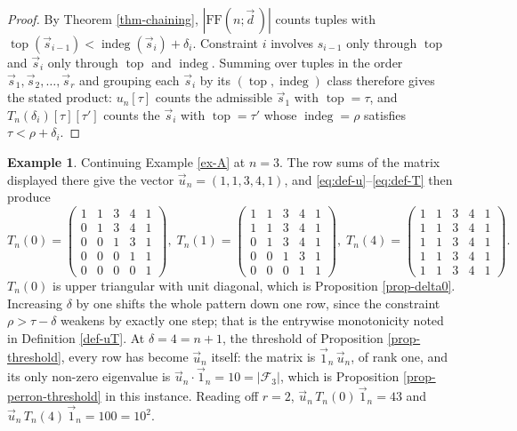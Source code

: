 \documentclass[11pt, a4paper, abstract=yes]{scrartcl}
\theoremstyle{definition}
\newtheorem{mexample}[definition]{Example}
\theoremstyle{remark}
\theoremstyle{plain}
\newcommand{\indeg}{\operatorname{indeg}}
\newcommand{\tp}{\operatorname{top}}
\begin{document}
\begin{proof}
By Theorem \ref{thm-chaining}, \(|\mathrm{FF}(n;\vec d\,)|\) counts tuples with
\(\tp(\vec s_{i-1})<\indeg(\vec s_i)+\delta_i\). Constraint \(i\) involves \(s_{i-1}\) only through \(\tp\) and
\(\vec s_i\) only through \(\tp\) and \(\indeg\). Summing over tuples in the order \(\vec s_1,\vec s_2,\dots,\vec s_r\)
and grouping each \(\vec s_i\) by its \((\tp,\indeg)\) class therefore gives the stated product: \(u_n[\tau]\)
counts the admissible \(\vec s_1\) with \(\tp=\tau\), and \(T_n(\delta_i)[\tau][\tau']\) counts the \(\vec s_i\)
with \(\tp=\tau'\) whose \(\indeg=\rho\) satisfies \(\tau<\rho+\delta_i\).
\end{proof}

\begin{mexample}
Continuing Example \ref{ex-A} at \(n=3\). The row sums of the matrix displayed there give the vector
\(\vec u_n=(1,1,3,4,1)\), and \eqref{eq:def-u}--\eqref{eq:def-T} then produce
\[
  T_n(0)=\begin{pmatrix}
    1&1&3&4&1\\ 0&1&3&4&1\\ 0&0&1&3&1\\ 0&0&0&1&1\\ 0&0&0&0&1
  \end{pmatrix},
  \;
  T_n(1)=\begin{pmatrix}
    1&1&3&4&1\\ 1&1&3&4&1\\ 0&1&3&4&1\\ 0&0&1&3&1\\ 0&0&0&1&1
  \end{pmatrix},
  \;
  T_n(4)=\begin{pmatrix}
    1&1&3&4&1\\ 1&1&3&4&1\\ 1&1&3&4&1\\ 1&1&3&4&1\\ 1&1&3&4&1
  \end{pmatrix}.
\]
\(T_n(0)\) is upper triangular with unit diagonal, which is Proposition \ref{prop-delta0}. Increasing
\(\delta\) by one shifts the whole pattern down one row, since the constraint
\(\rho>\tau-\delta\) weakens by exactly one step; that is the entrywise monotonicity noted in
Definition \ref{def-uT}. At \(\delta=4=n+1\), the threshold of
Proposition \ref{prop-threshold}, every row has become \(\vec u_n\) itself: the matrix is
\(\vec 1_n\,\vec u_n\), of rank one, and its only non-zero eigenvalue is
\(\vec u_n\cdot\vec 1_n=10=\lvert\mathcal F_3\rvert\), which is Proposition \ref{prop-perron-threshold} in
this instance. Reading off \(r=2\), \(\vec u_n\,T_n(0)\,\vec 1_n=43\) and \(\vec u_n\,T_n(4)\,\vec 1_n=100=10^2\).
\label{ex-uT}
\end{mexample}
\end{document}
